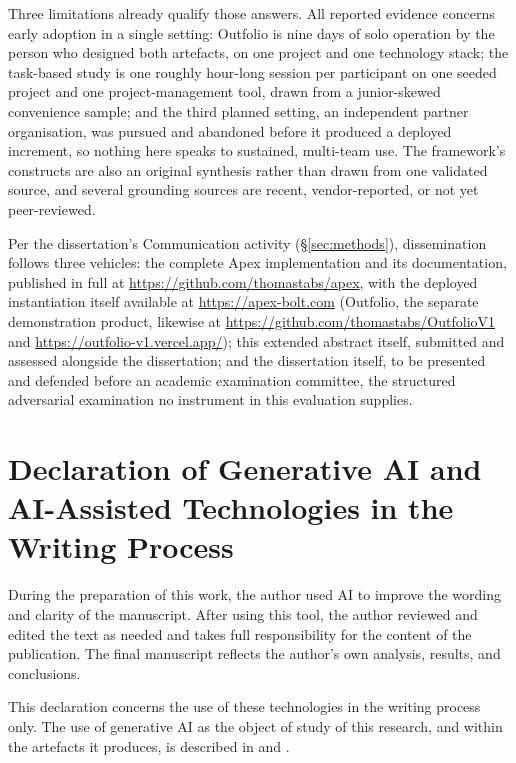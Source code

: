 \documentclass[sigconf,review=false]{acmart}
\begin{document}
Three limitations already qualify those answers. All reported evidence concerns early adoption in a single setting: Outfolio is nine days of solo operation by the person who designed both artefacts, on one project and one technology stack; the task-based study is one roughly hour-long session per participant on one seeded project and one project-management tool, drawn from a junior-skewed convenience sample; and the third planned setting, an independent partner organisation, was pursued and abandoned before it produced a deployed increment, so nothing here speaks to sustained, multi-team use. The framework's constructs are also an original synthesis rather than drawn from one validated source, and several grounding sources are recent, vendor-reported, or not yet peer-reviewed.

Per the dissertation's Communication activity (\S\ref{sec:methods}), dissemination follows three vehicles: the complete Apex implementation and its documentation, published in full at \url{https://github.com/thomastabs/apex}, with the deployed instantiation itself available at \url{https://apex-bolt.com} (Outfolio, the separate demonstration product, likewise at \url{https://github.com/thomastabs/OutfolioV1} and \url{https://outfolio-v1.vercel.app/}); this extended abstract itself, submitted and assessed alongside the dissertation; and the dissertation itself, to be presented and defended before an academic examination committee, the structured adversarial examination no instrument in this evaluation supplies.

\section*{Declaration of Generative AI and AI-Assisted Technologies in the Writing Process}

During the preparation of this work, the author used AI to improve the wording and clarity of the manuscript. After using this tool, the author reviewed and edited the text as needed and takes full responsibility for the content of the publication. The final manuscript reflects the author's own analysis, results, and conclusions.

This declaration concerns the use of these technologies in the writing process only. The use of generative AI as the object of study of this research, and within the artefacts it produces, is described in  and .



\end{document}
